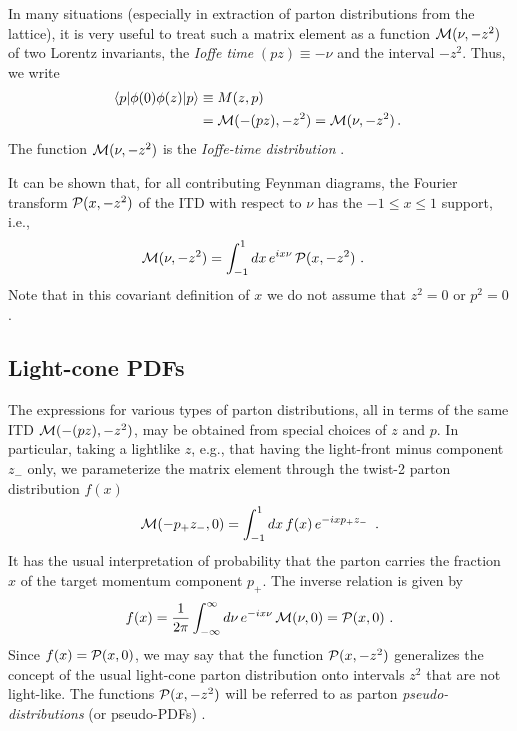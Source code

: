 \documentclass[final,5p,times,twocolumn]{elsarticle}
\newcommand{\nn}{\nonumber \\ }
\begin{document}
In many situations  (especially  in extraction of  parton distributions
from  the lattice),  it is very useful  to treat such a  matrix element 
 as a function 
${\cal M} (\nu, -z^2) $ of   two Lorentz invariants, the {\it Ioffe time}
\cite{Ioffe:1969kf}   \mbox{$(pz) \equiv -  \nu$}  
 and   the interval $-z^2$. Thus, we write 
  \begin{align}
  \langle p |   \phi(0) \phi (z)|p \rangle&  \equiv M(z,p) \nn & 
=   {\cal M} (-(pz), -z^2)  =  {\cal M} (\nu, -z^2)  
\,  .
 \
 \label{lorentz}
\end{align} 
The function 
    ${\cal M}(\nu , -z^2) $  is    the {\it Ioffe-time distribution}  \cite{Braun:1994jq}. 
    
 It can be shown \cite{Radyushkin:2016hsy,Radyushkin:1983wh}    that, for all contributing  Feynman diagrams,   
 the   Fourier transform  ${\cal P} (x, -z^2)$ of the ITD with respect to $\nu$ 
 has the $-1 \leq x \leq 1$ support, i.e., 
   \begin{align}
 {\cal M} (\nu, -z^2) 
&   = 
 \int_{-1}^1 dx 
 \, e^{i x \nu  } \,  {\cal P} (x, -z^2)  \   .
  \label{MPD}
\end{align}   
  Note that  in this covariant definition of $x$ we do not  assume that 
$z^2=0$ or $p^2=0$. 
  


 
 \subsection{Light-cone    PDFs}
 
 The expressions for  various types of parton distributions,
 all in terms of the same ITD   ${\cal M} (-(pz), -z^2)$,  may be  obtained from 
special  choices of 
 $z$ and $p$. 
In particular, taking  a lightlike  $z$, e.g., that  
having  the light-front minus component $z_-$  only, we   
parameterize the matrix element  through  the twist-2 parton distribution $f(x)$ 
  \begin{align}
  {\cal M} (-p_+ z_- , 0)  =
   \int_{-1}^1 dx \, f(x) \, 
e^{-ixp_+ z_-} \,  \   . 
 \label{twist2par0}
\end{align}
It has  the usual interpretation of  probability that 
the parton carries  the fraction $x$ of the target momentum 
component $p_+$.  
The inverse relation is given by 
\begin{align} 
 f  (x)  =\frac{1}{2 \pi}  \int_{-\infty}^{\infty}  d\nu \, e^{-i x \nu}  \, {\cal M}(\nu , 0)    = {\cal P} (x, 0) 
  \  .
\label{fxMnu}
\end{align}  
Since $f(x) =   {\cal P} (x, 0) $,  we may  say that 
the function $ {\cal P} (x, -z^2) $ generalizes 
the concept of the usual
light-cone parton distribution onto intervals $z^2$ that are not light-like. 
The functions  $ {\cal P} (x, -z^2)  $  will be referred to as parton 
{\it pseudo-distributions} (or pseudo-PDFs) \cite{Radyushkin:2017cyf}. 
 
\end{document}
